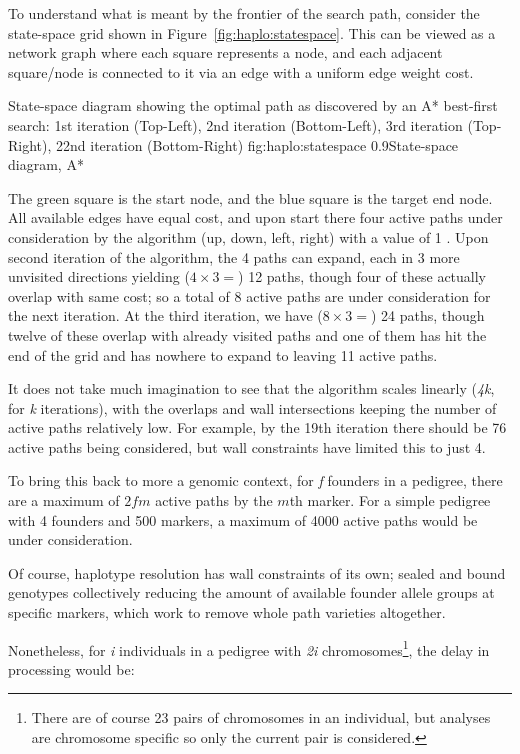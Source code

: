 To understand what is meant by the frontier of the search path, consider the state-space grid shown in Figure~\ref{fig:haplo:statespace}. This can be viewed as a network graph where each square represents a node, and each adjacent square/node is connected to it via an edge with a uniform edge weight cost.

	{State-space diagram showing the optimal path as discovered by an A* best-first search: 1st iteration (Top-Left), 2nd iteration (Bottom-Left), 3rd iteration (Top-Right), 22nd iteration (Bottom-Right)}
	{fig:haplo:statespace}
	{0.9}{State-space diagram, A*}
	
The green square is the start node, and the blue square is the target end node. All available edges have equal cost, and upon start there four active paths under consideration by the algorithm (up, down, left, right) with a value of 1 . Upon second iteration of the algorithm, the 4 paths can expand, each in 3 more unvisited directions yielding ($4 \times 3 = $) 12 paths, though four of these actually overlap with same cost; so a total of 8 active paths are under consideration for the next iteration. At the third iteration, we have ($8 \times 3 = $) 24 paths, though twelve of these overlap with already visited paths and one of them  has hit the end of the grid and has nowhere to expand to leaving 11 active paths.

It does not take much imagination to see that the algorithm scales linearly (\textit{4k}, for \textit{k} iterations), with the overlaps and wall intersections keeping the number of active paths relatively low. For example, by the 19th iteration there should be 76 active paths being considered, but wall constraints  have limited this to just 4.

To bring this back to more a genomic context, for \textit{f} founders in a pedigree, there are a maximum of $2fm$ active paths by the $m$th marker. For a simple pedigree with 4 founders and 500 markers, a maximum of 4000 active paths would be under consideration.

Of course, haplotype resolution has wall constraints of its own; sealed and bound genotypes  collectively reducing the amount of available founder allele groups at specific markers, which work to remove whole path varieties altogether.

Nonetheless, for \textit{i} individuals in a pedigree with \textit{2i} chromosomes\footnote{There are of course 23 pairs of chromosomes in an individual, but analyses are chromosome specific so only the current pair is considered.}, the delay in processing would be:

